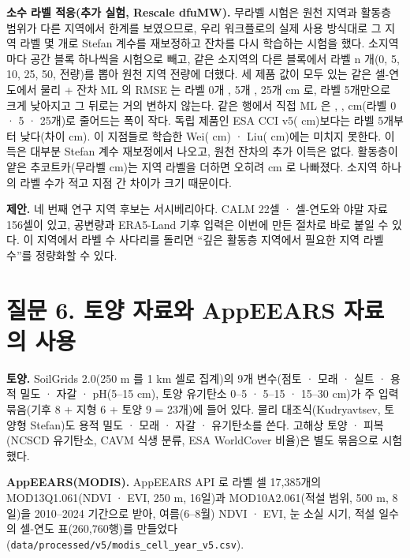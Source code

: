 \documentclass[10pt]{article}
\begin{document}
\textbf{소수 라벨 적응(추가 실험, Rescale dfuMW).} 무라벨 시험은 원천 지역과 활동층 범위가 다른 지역에서 한계를 보였으므로, 우리 워크플로의 실제 사용 방식대로 그 지역 라벨 몇 개로 Stefan 계수를 재보정하고 잔차를 다시 학습하는 시험을 했다. 소지역마다 공간 블록 하나씩을 시험으로 빼고, 같은 소지역의 다른 블록에서 라벨 n 개(0, 5, 10, 25, 50, 전량)를 뽑아 원천 지역 전량에 더했다. 세 제품 값이 모두 있는 같은 \nftrows{} 셀-연도에서 물리 + 잔차 ML 의 RMSE 는 라벨 0개 \nftAllRszero, 5개 \nftAllRsfive, 25개 \nftAllRstwfive{} cm 로, 라벨 5개만으로 크게 낮아지고 그 뒤로는 거의 변하지 않는다. 같은 행에서 직접 ML 은 \nftAllDszero, \nftAllDsfive, \nftAllDstwfive{} cm(라벨 0 · 5 · 25개)로 줄어드는 폭이 작다. 독립 제품인 ESA CCI v5(\nftAllCcifivezero{} cm)보다는 라벨 5개부터 낮다(차이 \nftdRsCcifivefive{} cm). 이 지점들로 학습한 Wei(\nftAllWeizero{} cm) · Liu(\nftAllLiuzero{} cm)에는 미치지 못한다. 이득은 대부분 Stefan 계수 재보정에서 나오고, 원천 잔차의 추가 이득은 없다. 활동층이 얕은 추코트카(무라벨 \nftChRszero{} cm)는 지역 라벨을 더하면 오히려 \nftChRsfive{} cm 로 나빠졌다. 소지역 하나의 라벨 수가 적고 지점 간 차이가 크기 때문이다.

\textbf{제안.} 네 번째 연구 지역 후보는 서시베리아다. CALM 22셀 · \nextnWs{} 셀-연도와 야말 자료 156셀이 있고, 공변량과 ERA5-Land 기후 입력은 이번에 만든 절차로 바로 붙일 수 있다. 이 지역에서 라벨 수 사다리를 돌리면 ``깊은 활동층 지역에서 필요한 지역 라벨 수''를 정량화할 수 있다.

\section{질문 6. 토양 자료와 AppEEARS 자료의 사용}
\textbf{토양.} SoilGrids 2.0(250 m 를 1 km 셀로 집계)의 9개 변수(점토 · 모래 · 실트 · 용적 밀도 · 자갈 · pH(5--15 cm), 토양 유기탄소 0--5 · 5--15 · 15--30 cm)가 주 입력 묶음(기후 8 + 지형 6 + 토양 9 = 23개)에 들어 있다. 물리 대조식(Kudryavtsev, 토양형 Stefan)도 용적 밀도 · 모래 · 자갈 · 유기탄소를 쓴다. 고해상 토양 · 피복(NCSCD 유기탄소, CAVM 식생 분류, ESA WorldCover 비율)은 별도 묶음으로 시험했다.

\textbf{AppEEARS(MODIS).} AppEEARS API 로 라벨 셀 17,385개의 MOD13Q1.061(NDVI · EVI, 250 m, 16일)과 MOD10A2.061(적설 범위, 500 m, 8일)을 2010--2024 기간으로 받아, 여름(6--8월) NDVI · EVI, 눈 소실 시기, 적설 일수의 셀-연도 표(260,760행)를 만들었다(\texttt{data/processed/v5/modis\_cell\_year\_v5.csv}).
\end{document}
